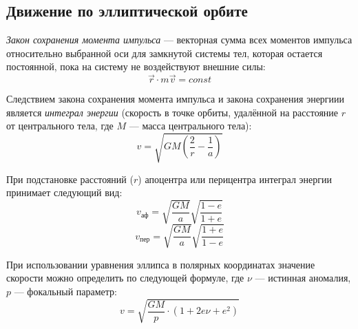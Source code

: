 \subsection{Движение по эллиптической орбите}

\textit{Закон сохранения момента импульса} ---  векторная сумма всех моментов импульса относительно выбранной оси для замкнутой системы тел, которая остается постоянной, пока на систему не воздействуют внешние силы:
\begin{equation}
\vec{r} \cdot m\vec{v}=const  
\end{equation}

Следствием закона сохранения момента импульса и закона сохранения энергиии является        \textit{ интеграл энергии} (скорость в точке орбиты, удалённой на расстояние $r$ от центрального тела, где $M$ --- масса центрального тела):
\begin{equation}v=\sqrt{GM\left(\frac2r - \frac1a\right)}
\end{equation}

При подстановке расстояний ($r$) апоцентра или перицентра интеграл энергии принимает следующий вид:
\begin{equation}v_{\text{аф}}=\sqrt{\frac{GM}{a}} \sqrt{\frac{1-e}{1+e}}
\end{equation}
\begin{equation}v_{\text{пер}}=\sqrt{\frac{GM}{a}}\sqrt{\frac{1+e}{1-e}}
\end{equation}

При использовании уравнения эллипса в полярных координатах значение скорости можно определить по следующей формуле, где $\nu$ --- истинная аномалия, $p$ --- фокальный параметр:
\begin{equation}v=\sqrt{\frac{GM}{p}\cdot(1+2e\nu+e^2)}
\end{equation}
